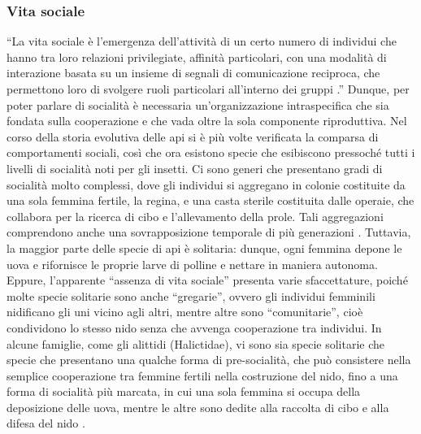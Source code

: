 \documentclass[main.tex]{subfiles}
\begin{document}
\subsubsection{Vita sociale}

“La vita sociale è l'emergenza dell'attività di un certo numero di individui che hanno tra loro relazioni privilegiate, affinità particolari, con una modalità di interazione basata su un insieme di segnali di comunicazione reciproca, che permettono loro di svolgere ruoli particolari all’interno dei gruppi \citep{camp}.”
Dunque, per poter parlare di socialità è necessaria un’organizzazione intraspecifica che sia fondata sulla cooperazione e che vada oltre la sola componente riproduttiva.
Nel corso della storia evolutiva delle api si è più volte verificata la comparsa di comportamenti sociali, così che ora esistono specie che esibiscono pressoché tutti i livelli di socialità noti per gli insetti. Ci sono generi che presentano gradi di socialità molto complessi, dove gli individui si aggregano in colonie costituite da una sola femmina fertile, la regina, e una casta sterile costituita dalle operaie, che collabora per la ricerca di cibo e l’allevamento della prole. Tali aggregazioni comprendono anche una sovrapposizione temporale di più generazioni \citep{turil}.
Tuttavia, la maggior parte delle specie di api è solitaria: dunque, ogni femmina depone le uova e rifornisce le proprie larve di polline e nettare in maniera autonoma. Eppure, l’apparente “assenza di vita sociale” presenta varie sfaccettature, poiché molte specie solitarie sono anche “gregarie”, ovvero gli individui femminili nidificano gli uni vicino agli altri, mentre altre sono “comunitarie”, cioè condividono lo stesso nido senza che avvenga cooperazione tra individui. In alcune famiglie, come gli alittidi (Halictidae), vi sono sia specie solitarie che specie che presentano una qualche forma di pre-socialità, che può consistere nella semplice cooperazione tra femmine fertili nella costruzione del nido, fino a una forma di socialità più marcata, in cui una sola femmina si occupa della deposizione delle uova, mentre le altre sono dedite alla raccolta di cibo e alla difesa del nido \citep{aldi}.
\end{document}
